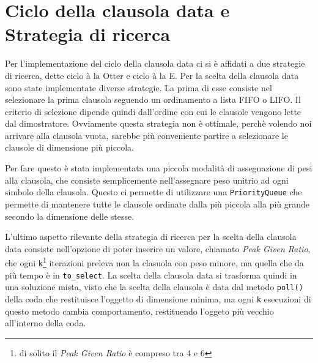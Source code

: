 \documentclass[a4paper,11pt]{article}
\begin{document}
\section{Ciclo della clausola data e Strategia di ricerca}
Per l'implementazione del ciclo della clausola data ci si è affidati a due strategie di ricerca, dette ciclo à la Otter e ciclo à la E. Per la scelta della clausola data sono state implementate diverse strategie. La prima di esse consiste nel selezionare la prima clausola seguendo un ordinamento a lista FIFO o LIFO. Il criterio di selezione dipende quindi dall’ordine con cui le clausole vengono lette dal dimostratore. Ovviamente questa strategia non è ottimale, perchè volendo noi arrivare alla clausola vuota, sarebbe più conveniente partire a selezionare le clausole di dimensione più piccola.\par
Per fare questo è stata implementata una piccola modalità di assegnazione di pesi alla clausola, che consiste semplicemente nell'assegnare peso unitrio ad ogni simbolo della clausola. Questo ci permette di utilizzare una \texttt{PriorityQueue} che permette di mantenere tutte le clausole ordinate dalla più piccola alla più grande secondo la dimensione delle stesse. \par
L'ultimo aspetto rilevante della strategia di ricerca per la scelta della clausola data consiste nell'opzione di poter inserire un valore, chiamato \emph{Peak Given Ratio}, che ogni \texttt{k}\footnote{di solito il \emph{Peak Given Ratio} è compreso tra 4 e 6} iterazioni preleva non la clasuola con peso minore, ma quella che da più tempo è in \texttt{to\_select}. La scelta della clausola data si trasforma quindi in una soluzione mista, visto che la scelta della clausola è data dal metodo \texttt{poll()} della coda che restituisce l'oggetto di dimensione minima, ma ogni \texttt{k} esecuzioni di questo metodo cambia comportamento, restituendo l'oggeto più vecchio all'interno della coda.
\end{document}
